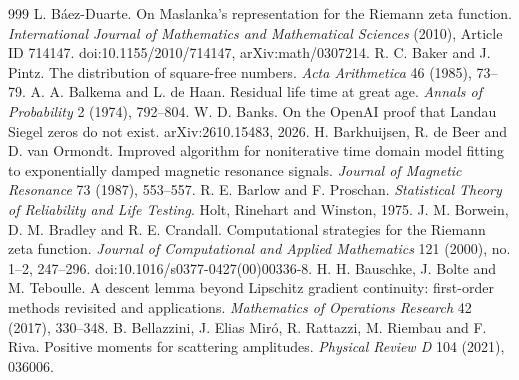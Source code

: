 \begin{thebibliography}{999}
 L. B\'aez-Duarte. On Maslanka's representation for the Riemann zeta function. \emph{International Journal of Mathematics and Mathematical Sciences} (2010), Article ID 714147. doi:10.1155/2010/714147, arXiv:math/0307214.
 R. C. Baker and J. Pintz. The distribution of square-free numbers. \emph{Acta Arithmetica} 46 (1985), 73--79.
 A. A. Balkema and L. de Haan. Residual life time at great age. \emph{Annals of Probability} 2 (1974), 792--804.
 W. D. Banks. On the OpenAI proof that Landau Siegel zeros do not exist. arXiv:2610.15483, 2026.
 H. Barkhuijsen, R. de Beer and D. van Ormondt. Improved algorithm for noniterative time domain model fitting to exponentially damped magnetic resonance signals. \emph{Journal of Magnetic Resonance} 73 (1987), 553--557.
 R. E. Barlow and F. Proschan. \emph{Statistical Theory of Reliability and Life Testing}. Holt, Rinehart and Winston, 1975.
 J. M. Borwein, D. M. Bradley and R. E. Crandall. Computational strategies for the Riemann zeta function. \emph{Journal of Computational and Applied Mathematics} 121 (2000), no. 1--2, 247--296. doi:10.1016/s0377-0427(00)00336-8.
 H. H. Bauschke, J. Bolte and M. Teboulle. A descent lemma beyond Lipschitz gradient continuity: first-order methods revisited and applications. \emph{Mathematics of Operations Research} 42 (2017), 330--348.
 B. Bellazzini, J. Elias Mir\'o, R. Rattazzi, M. Riembau and F. Riva. Positive moments for scattering amplitudes. \emph{Physical Review D} 104 (2021), 036006.

\end{thebibliography}
